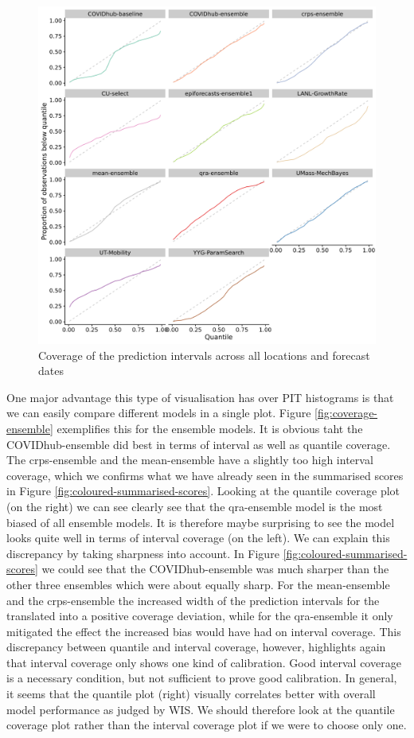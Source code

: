\documentclass[
]{book}
\begin{document}
\begin{figure}
\includegraphics[width=1\linewidth]{../visualisation/chapter-5-results/quantile-coverage-all} \caption{Coverage of the prediction intervals across all locations and forecast dates}\label{fig:quantile-coverage-all}
\end{figure}

One major advantage this type of visualisation has over PIT histograms is that we can easily compare different models in a single plot. Figure \ref{fig:coverage-ensemble} exemplifies this for the ensemble models. It is obvious taht the COVIDhub-ensemble did best in terms of interval as well as quantile coverage. The crps-ensemble and the mean-ensemble have a slightly too high interval coverage, which we confirms what we have already seen in the summarised scores in Figure \ref{fig:coloured-summarised-scores}. Looking at the quantile coverage plot (on the right) we can see clearly see that the qra-ensemble model is the most biased of all ensemble models. It is therefore maybe surprising to see the model looks quite well in terms of interval coverage (on the left). We can explain this discrepancy by taking sharpness into account. In Figure \ref{fig:coloured-summarised-scores} we could see that the COVIDhub-ensemble was much sharper than the other three ensembles which were about equally sharp. For the mean-ensemble and the crps-ensemble the increased width of the prediction intervals for the translated into a positive coverage deviation, while for the qra-ensemble it only mitigated the effect the increased bias would have had on interval coverage. This discrepancy between quantile and interval coverage, however, highlights again that interval coverage only shows one kind of calibration. Good interval coverage is a necessary condition, but not sufficient to prove good calibration. In general, it seems that the quantile plot (right) visually correlates better with overall model performance as judged by WIS. We should therefore look at the quantile coverage plot rather than the interval coverage plot if we were to choose only one.
\end{document}
